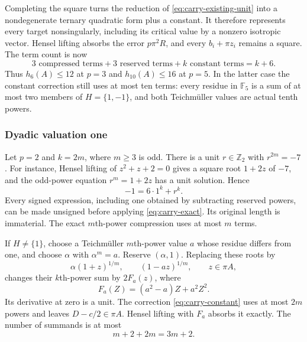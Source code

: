 \documentclass[11pt]{amsart}
\theoremstyle{definition}
\numberwithin{equation}{section}
\begin{document}
Completing the square turns the reduction of
\eqref{eq:carry-existing-unit} into a nondegenerate ternary quadratic
form plus a constant. It therefore represents every target
nonsingularly, including its critical value by a nonzero isotropic
vector. Hensel lifting absorbs the error $p\pi^2R$, and every
$b_i+\pi z_i$ remains a square. The term count is now
\begin{equation}\label{eq:carry-special-count}
 3\text{ compressed terms}+3\text{ reserved terms}
       +k\text{ constant terms}=k+6.
\end{equation}
Thus $h_6(A)\le12$ at $p=3$ and $h_{10}(A)\le16$ at $p=5$.
In the latter case the constant correction still uses at most ten
terms: every residue in $\mathbb F_5$ is a sum of at most two
members of $H=\{1,-1\}$, and both Teichm\"uller values are actual
tenth powers. 

\subsubsection{Dyadic valuation one}

Let $p=2$ and $k=2m$, where $m\ge3$ is odd.
There is a unit $r\in\mathbb Z_2$ with $r^{2m}=-7$.
For instance, Hensel lifting of $z^2+z+2=0$ gives a square root
$1+2z$ of $-7$, and the odd-power equation $r^m=1+2z$ has a
unit solution. Hence
\[
 -1=6\cdot1^k+r^k.
\]
Every signed expression, including one obtained by subtracting
reserved powers, can be made unsigned before applying
\eqref{eq:carry-exact}. Its original length is immaterial.
The exact $m$th-power compression uses at most $m$ terms.

If $H\ne\{1\}$, choose a Teichm\"uller $m$th-power value $a$
whose residue differs from one, and choose $\alpha$ with $\alpha^m=a$.
Reserve $(\alpha,1)$. Replacing these roots by
\[
 \alpha(1+z)^{1/m},\qquad(1-az)^{1/m},\qquad z\in\pi A,
\]
changes their $k$th-power sum by $2F_a(z)$, where
\begin{equation}\label{eq:carry-dyadic-pair}
 F_a(Z)=(a^2-a)Z+a^2Z^2.
\end{equation}
Its derivative at zero is a unit. The correction
\eqref{eq:carry-constant} uses at most $2m$ powers and leaves
$D-c/2\in\pi A$. Hensel lifting with $F_a$ absorbs it exactly.
The number of summands is at most
\begin{equation}\label{eq:carry-dyadic-nontrivial-count}
 m+2+2m=3m+2.
\end{equation}
\end{document}
